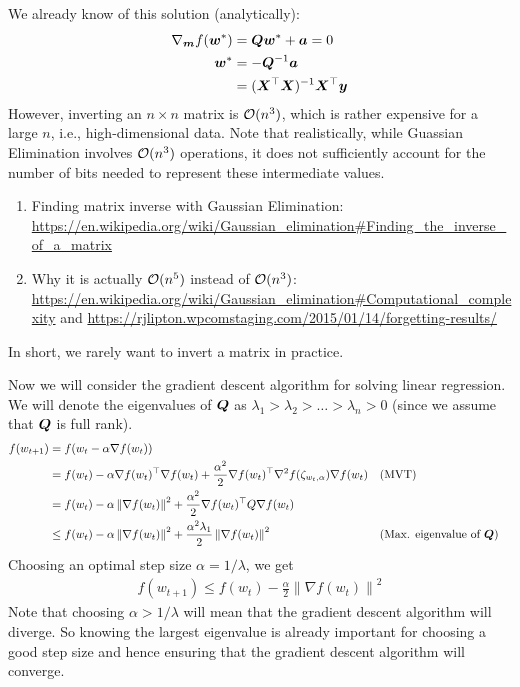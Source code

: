 \documentclass{article}
\theoremstyle{plain}
\theoremstyle{definition}
\theoremstyle{remark}
\newcommand{\norm}[1]{\left\lVert#1\right\rVert}
\begin{document}
We already know of this solution (analytically):
\begin{align}
    \nabla_{\bm{m}} f({\bm{w}}^*) & = {\bm{Q}} {\bm{w}}^* + {\bm{a}} = 0        \\
    {\bm{w}}^*               & = -{\bm{Q}}^{-1} {\bm{a}}              \\
                        & = ({\bm{X}}{^{\top}} {\bm{X}})^{-1} {\bm{X}}{^{\top}} {\bm{y}}
\end{align}
However, inverting an $n \times n$ matrix is ${\mathcal{O}}(n^3)$, which is rather expensive for a large $n$, i.e., high-dimensional data.
%
Note that realistically, while Guassian Elimination involves ${\mathcal{O}}(n^3)$ operations, it does not sufficiently account for the number of bits needed to represent these intermediate values.
\begin{enumerate}
    \item Finding matrix inverse with Gaussian Elimination: \url{https://en.wikipedia.org/wiki/Gaussian_elimination#Finding_the_inverse_of_a_matrix}
    \item Why it is actually ${\mathcal{O}}({n^5})$ instead of ${\mathcal{O}}({n^3})$: \url{https://en.wikipedia.org/wiki/Gaussian_elimination#Computational_complexity} and \url{https://rjlipton.wpcomstaging.com/2015/01/14/forgetting-results/}
\end{enumerate}

In short, we rarely want to invert a matrix in practice.

Now we will consider the gradient descent algorithm for solving linear regression.
%
We will denote the eigenvalues of ${\bm{Q}}$ as $\lambda_1 > \lambda_2 > \ldots > \lambda_n > 0$ (since we assume that ${\bm{Q}}$ is full rank).
%
\begin{align}
    f(w_{t+1}) & = f(w_t - \alpha \nabla f(w_t))                                                                                                                                          \\
               & =  f(w_t) - \alpha \nabla f(w_t)\T \nabla f(w_t) + \frac{\alpha^2}{2} \nabla f(w_t)\T \nabla^2 f(\zeta_{w_t,\alpha}) \nabla f(w_t) &  & \mathrm{(MVT)}                   \\
               & = f(w_t) - \alpha \norm{\nabla f(w_t)}^2 + \frac{\alpha^2}{2} \nabla f(w_t)\T Q \nabla f(w_t)                                                                            \\
               & \le f(w_t) - \alpha \norm{\nabla f(w_t)}^2 + \frac{\alpha^2 \lambda_1}{2} \norm{\nabla f(w_t)}^2                                   &  & (\text{Max. eigenvalue of } \mQ) \\
\end{align}
Choosing an optimal step size $\alpha = 1/\lambda$, we get
\begin{align}
    f(w_{t+1}) \le f(w_t) - \frac{\alpha}{2} \norm{\nabla f(w_t)}^2
\end{align}
Note that choosing $\alpha > 1/\lambda$ will mean that the gradient descent algorithm will diverge.
%
So knowing the largest eigenvalue is already important for choosing a good step size and hence ensuring that the gradient descent algorithm will converge.
%
\end{document}
